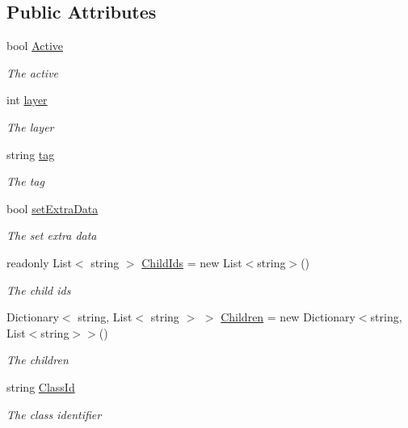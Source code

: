 \subsection*{Public Attributes}
\begin{DoxyCompactItemize}
\item 
bool \hyperlink{class_level_serializer_1_1_stored_item_a4b06764c8b12b1fa93f3998fff3cec43}{Active}
\begin{DoxyCompactList}\small\item\em The active \end{DoxyCompactList}\item 
int \hyperlink{class_level_serializer_1_1_stored_item_ab417bb1160e27533ab32d21ae00b8e44}{layer}
\begin{DoxyCompactList}\small\item\em The layer \end{DoxyCompactList}\item 
string \hyperlink{class_level_serializer_1_1_stored_item_ab053de4512b0a11644a519d03df14072}{tag}
\begin{DoxyCompactList}\small\item\em The tag \end{DoxyCompactList}\item 
bool \hyperlink{class_level_serializer_1_1_stored_item_a4b8e0f3cc2ddd5971718989876df2d9b}{set\+Extra\+Data}
\begin{DoxyCompactList}\small\item\em The set extra data \end{DoxyCompactList}\item 
readonly List$<$ string $>$ \hyperlink{class_level_serializer_1_1_stored_item_a1efb451e94bbf1f94e342e5a27482db6}{Child\+Ids} = new List$<$string$>$()
\begin{DoxyCompactList}\small\item\em The child ids \end{DoxyCompactList}\item 
Dictionary$<$ string, List$<$ string $>$ $>$ \hyperlink{class_level_serializer_1_1_stored_item_ad8df20b6800e56c64374ca090510f652}{Children} = new Dictionary$<$string, List$<$string$>$$>$()
\begin{DoxyCompactList}\small\item\em The children \end{DoxyCompactList}\item 
string \hyperlink{class_level_serializer_1_1_stored_item_a4361f3d9b6725d74d95152e2b03c5c9c}{Class\+Id}
\begin{DoxyCompactList}\small\item\em The class identifier \end{DoxyCompactList}\item 
$$
\end{DoxyCompactItemize}
